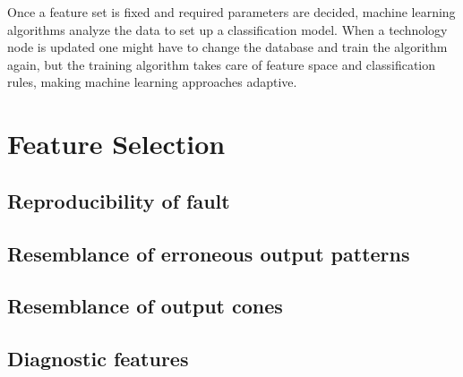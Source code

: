 Once a feature set is fixed and required parameters are decided, machine learning algorithms analyze the data to set up a classification model. When a technology node is updated one might have to change the database and train the algorithm again, but the training algorithm takes care of feature space and classification rules, making machine learning approaches adaptive.

\section{Feature Selection}

\subsection{Reproducibility of fault}

\subsection{Resemblance of erroneous output patterns}

\subsection{Resemblance of output cones}

\subsection{Diagnostic features}


